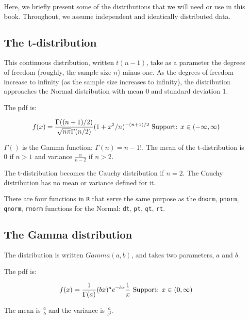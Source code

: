 \documentclass[12pt,]{krantz}
\begin{document}
Here, we briefly present some of the distributions that we will need or use in this book. Throughout, we assume independent and identically distributed data.

\hypertarget{the-t-distribution}{%
\subsection{The t-distribution}\label{the-t-distribution}}

This continuous distribution, written \(t(n-1)\), take as a parameter the degrees of freedom (roughly, the sample size \(n\)) minus one. As the degrees of freedom increase to infinity (as the sample size increases to infinity), the distribution approaches the Normal distribution with mean 0 and standard deviation 1.

The pdf is:

\begin{equation}
f(x) = \frac{\Gamma((n+1)/2)}{\sqrt{n\pi} \Gamma(n/2)} (1+x^2/n)^{-(n+1)/2} \hbox{  Support: } x \in (-\infty, \infty)
\end{equation}

\(\Gamma()\) is the Gamma function: \(\Gamma(n)=n-1!\).
The mean of the t-distribution is \(0\) if \(n>1\) and variance \(\frac{n}{n-2}\) if \(n>2\).

The t-distribution becomes the Cauchy distribution if \(n=2\). The Cauchy distribution has no mean or variance defined for it.

There are four functions in \texttt{R} that serve the same purpose as the \texttt{dnorm}, \texttt{pnorm}, \texttt{qnorm}, \texttt{rnorm} functions for the Normal:
\texttt{dt}, \texttt{pt}, \texttt{qt}, \texttt{rt}.

\hypertarget{the-gamma-distribution}{%
\subsection{The Gamma distribution}\label{the-gamma-distribution}}

The distribution is written \(Gamma(a,b)\), and takes two parameters, \(a\) and \(b\).

The pdf is:

\begin{equation}
f(x) = \frac{1}{\Gamma(a)}(b x)^ae^{-b x}\frac{1}{x} \hbox{  Support: } x \in (0, \infty)
\end{equation}

The mean is \(\frac{a}{b}\) and the variance is \(\frac{a}{b^2}\).
\end{document}
